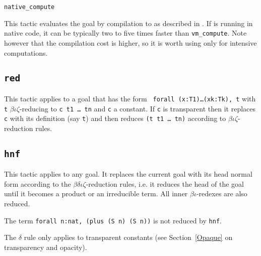 \begin{coq_example*}
\begin{Variants}
\item {\tt native\_compute} 

  This tactic evaluates the goal by compilation to \ocaml{} as described in
  \cite{FullReduction}. If \Coq{} is running in native code, it can be typically
  two to five times faster than {\tt vm\_compute}. Note however that the
  compilation cost is higher, so it is worth using only for intensive
  computations.

\end{Variants}

%


\subsection{\tt red}

This tactic applies to a goal that has the form {\tt
  forall (x:T1)\dots(xk:Tk), t} with {\tt t}
$\beta\iota\zeta$-reducing to {\tt c t1 \dots\ tn} and {\tt c} a
constant.  If
{\tt c} is transparent then it replaces {\tt c} with its definition
(say {\tt t}) and then reduces {\tt (t t1 \dots\ tn)} according to
$\beta\iota\zeta$-reduction rules.

\begin{ErrMsgs}
\item {}
\end{ErrMsgs}

\subsection{\tt hnf}

This tactic applies to any goal. It replaces the current goal with its
head normal form according to the $\beta\delta\iota\zeta$-reduction
rules, i.e.  it reduces the head of the goal until it becomes a
product or an irreducible term. All inner $\beta\iota$-redexes are also
reduced.

\Example
The term \verb+forall n:nat, (plus (S n) (S n))+ is not reduced by {\tt hnf}.

\Rem The $\delta$ rule only applies to transparent constants
(see Section~\ref{Opaque} on transparency and opacity).


\end{coq_example*}
